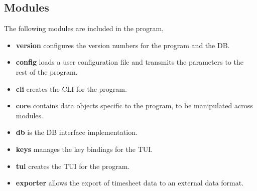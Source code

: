 \subsection{Modules}
The following modules are included in the program,
\begin{itemize}
\item \textbf{version} configures the version numbers for the program and the
  \gls{DB}.
\item \textbf{config} loads a user configuration file and transmits the
  parameters to the rest of the program.
\item \textbf{cli} creates the \gls{CLI} for the program.
\item \textbf{core} contains data objects specific to the program, to be
  manipulated across modules.
\item \textbf{db} is the \gls{DB} interface implementation.
\item \textbf{keys} manages the key bindings for the \gls{TUI}.
\item \textbf{tui} creates the \gls{TUI} for the program.
\item \textbf{exporter} allows the export of timesheet data to an external
  data format.
\end{itemize}
